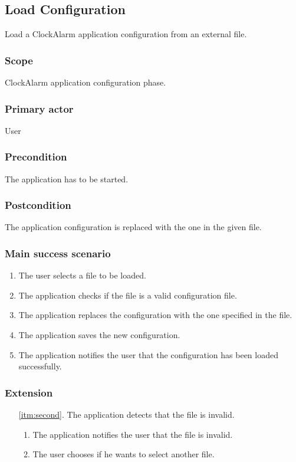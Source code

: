 \subsection{Load Configuration}
Load a ClockAlarm application configuration from an external file.
\subsubsection{Scope}
ClockAlarm application configuration phase.
\subsubsection{Primary actor}
User
\subsubsection{Precondition}
The application has to be started.
\subsubsection{Postcondition}
The application configuration is replaced with the one in the given file.
\subsubsection{Main success scenario}
\begin{enumerate}
	\item The user selects a file to be loaded.
	\item \label{itm:second} The application checks if the file is a valid configuration file.
	\item The application replaces the configuration with the one specified in the file.
	\item The application saves the new configuration.
	\item The application notifies the user that the configuration has been loaded successfully.
\end{enumerate}
\subsubsection{Extension}
\begin{enumerate}
	\item[\ref{itm:second}.] The application detects that the file is invalid.
		\begin{enumerate}[i]
			\item The application notifies the user that the file is invalid.
			\item The user chooses if he wants to select another file.
		\end{enumerate}
\end{enumerate}